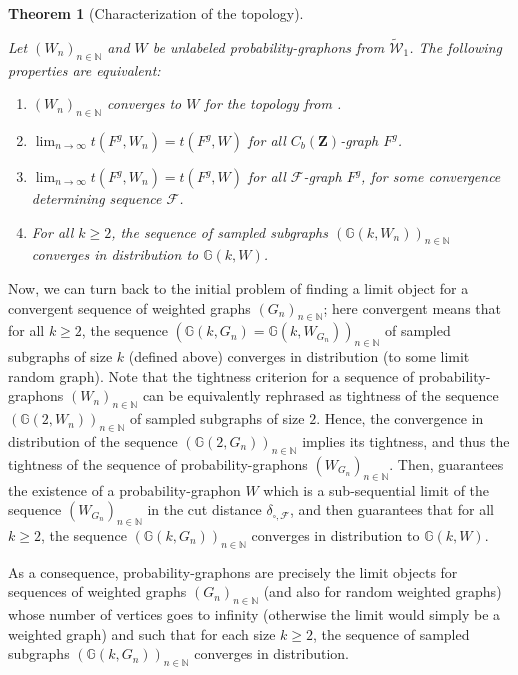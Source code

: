 \documentclass{amsart}
\theoremstyle{plain}
\newtheorem{theo}[Th]{Theorem}
\theoremstyle{definition}
\newcommand{\Space}{\mathbf{Z}}
\newcommand{\bbG}{\mathbb{G}}
\newcommand{\CbFunct}{C_b(\Space)}
\newcommand{\UGraphon}{\widetilde{\mathcal{W}}_1}
\newcommand{\ddcutF}{\delta_{\square,\mathcal{F}}}
\newcommand{\F}{\mathcal{F}}
\newcommand{\N}{\mathbb{N}}
\begin{document}
\begin{theo}[Characterization of the topology]
	\label{intro:theo_equiv_topo_dens_homo}

Let $(W_n )_{n\in\N}$ and $W$ be unlabeled probability-graphons
	from $\UGraphon$.
The following properties are equivalent:
\begin{enumerate}[label=(\roman*)]
\item\label{equiv_topo_dens_homo_1}
$(W_n)_{n\in\N}$ converges to $W$ for 
	 the topology  from .

\item\label{equiv_topo_dens_homo_2}
$\lim_{n\to\infty} t(F^g,W_n) = t(F^g,W)$  
for all $\CbFunct$-graph $F^g$.

\item\label{equiv_topo_dens_homo_3}
$\lim_{n\to\infty} t(F^g,W_n) = t(F^g,W)$ 
for all $\F$-graph $F^g$, for some convergence determining sequence $\F$.

\item\label{equiv_topo_dens_homo_4}
For all $k\geq 2$, the sequence of sampled subgraphs $(\bbG(k,W_n))_{n\in\N}$
	converges in distribution to $\bbG(k,W)$.
\end{enumerate}
\end{theo}

Now, we can turn back to the initial problem of finding a limit object
	for a convergent sequence of weighted graphs $(G_n)_{n\in\N}$;
	here convergent means that for all $k\geq 2$,
	the sequence $(\bbG(k,G_n)=\bbG(k,W_{G_n}))_{n\in\N}$ of sampled subgraphs of size $k$
		(defined above)
		converges in distribution (to some limit random graph).
Note that the tightness criterion for a sequence of probability-graphons $(W_n)_{n\in\N}$ 
	can be equivalently rephrased as tightness of the sequence $(\bbG(2,W_n))_{n\in\N}$ of sampled subgraphs  of size $2$.
Hence, the convergence in distribution of  the sequence $(\bbG(2,G_n))_{n\in\N}$ implies its tightness,
	and thus the tightness of the sequence of probability-graphons $(W_{G_n})_{n\in\N}$.
Then,  guarantees the existence of a probability-graphon $W$
	which is a sub-sequential limit of the sequence $(W_{G_n})_{n\in\N}$ in the cut distance $\ddcutF$,
	and then  guarantees that for all $k\geq 2$,
		the sequence $(\bbG(k,G_n))_{n\in\N}$ converges in distribution to $\bbG(k,W)$.
		
As a consequence, probability-graphons are precisely the limit objects for
	sequences of weighted graphs $(G_n)_{n\in\N}$ (and also for random weighted graphs)
	whose number of vertices goes to infinity (otherwise the limit would simply be a weighted graph)
	and such that for each size $k\geq 2$, the sequence of sampled subgraphs
		$(\bbG(k,G_n))_{n\in\N}$ converges in distribution.
	
\end{document}
